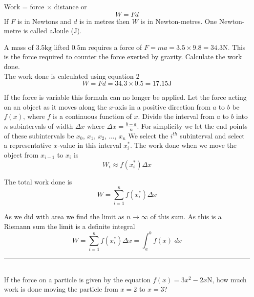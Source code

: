 Work = force $ \times $ distance or
\begin{equation}W =F d\tag{2}
\end{equation}If $F$ is in Newtons and $d$ is in metres then $W$ is in Newton-metres. One Newton-metre is called a\linebreak\relax Joule
($\mbox{J}$). 

\example A mass of $3.5 \mbox{kg}$ lifted $0.5 \mbox{m}$ requires a force of $\displaystyle F =m a =3.5 \times 9.8 =34.3 \mbox{N}$. This is the force required to counter the force exerted by gravity. Calculate the work done.\\
\solution The work done is calculated using equation 2
\begin{equation*}W =F d =34.3 \times 0.5 =17.15 \mbox{J}
\end{equation*}

If the force is variable this formula can no longer be applied. Let
the force acting on an object as it moves along the $x$-axis in a positive direction from $a$ to $b$ be $f (x)$, where $f$ is a continuous function of $x$. Divide the interval from $a$ to $b$ into $n$ subintervals of width $ \Delta x$ where $ \Delta x =\frac{b -a}{n}$. For
simplicity we let the end points of these subintervals be $x_{0}$, $x_{1}$, $x_{2}$, ..., $x_{n}$ We select the $i^{t h}$ subinterval and select a representative $x$-value in this interval $x_{i}^{ \ast }$. The work done when we move the object from $x_{i -1}$ to $x_{i}$ is
\begin{equation*}W_{i} \approx f (x_{i}^{ \ast })  \Delta x
\end{equation*}

The total work done is
\begin{equation}W =\sum _{i =1}^{n}f (x_{i}^{ \ast })  \Delta x\tag{3}
\end{equation}

As we did with area we find the limit as $n \rightarrow \infty $ of this sum. As this is a Riemann sum the limit is a definite integral
\begin{equation}W =\sum _{i =1}^{n}f (x_{i}^{ \ast })  \Delta x =\int _{a}^{b}f (x)\; d x\tag{4}
\end{equation}
\rule{6.8cm}{0.5pt}\\
\example If the force on a particle is given by the equation $f (x) =3 x^{2} -2 x \mbox{N}$, how much work is done moving the particle from $x =2$ to $x =3$?

